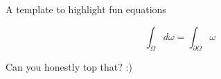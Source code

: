 \documentclass{beamer}
\begin{document}
\begin{frame}

\LARGE
\begin{center}
A template to highlight fun equations

\end{center}


\huge
\begin{equation*}
    \int_\Omega d \omega = \int_{\partial \Omega} \omega
\end{equation*}

\vfill

\small
Can you honestly top that? :)


\end{frame}
\end{document}
